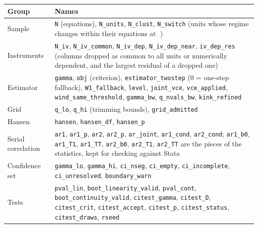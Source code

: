 \documentclass[
  10.5pt,
  a4paper,
]{article}
\newcounter{none} %
\begin{document}
{\def\LTcaptype{none} %
\begin{longtable}[]{@{}
  >{\raggedright\arraybackslash}p{}
  >{\raggedright\arraybackslash}p{}@{}}
\toprule\noalign{}
\begin{minipage}[b]{\linewidth}\raggedright
Group
\end{minipage} & \begin{minipage}[b]{\linewidth}\raggedright
Names
\end{minipage} \\
\midrule\noalign{}
\endhead
\bottomrule\noalign{}
\endlastfoot
Sample & \texttt{N} (equations), \texttt{N\_units}, \texttt{N\_clust},
\texttt{N\_switch} (units whose regime changes within their equations at
) \\
Instruments & \texttt{N\_iv}, \texttt{N\_iv\_common},
\texttt{N\_iv\_dep}, \texttt{N\_iv\_dep\_near}, \texttt{iv\_dep\_res}
(columns dropped as common to all units or numerically dependent, and
the largest residual of a dropped one) \\
Estimator & \texttt{gamma}, \texttt{obj} (criterion),
\texttt{estimator\_twostep} (0 = one-step fallback),
\texttt{W1\_fallback}, \texttt{level}, \texttt{joint\_vce},
\texttt{vce\_applied}, \texttt{wind\_same\_threshold},
\texttt{gamma\_bw}, \texttt{q\_nvals\_bw}, \texttt{kink\_refined} \\
Grid & \texttt{q\_lo}, \texttt{q\_hi} (trimming bounds),
\texttt{grid\_admitted} \\
Hansen & \texttt{hansen}, \texttt{hansen\_df}, \texttt{hansen\_p} \\
Serial correlation & \texttt{ar1}, \texttt{ar1\_p}, \texttt{ar2},
\texttt{ar2\_p}, \texttt{ar\_joint}, \texttt{ar1\_cond},
\texttt{ar2\_cond}; \texttt{ar1\_b0}, \texttt{ar1\_T1},
\texttt{ar1\_TT}, \texttt{ar2\_b0}, \texttt{ar2\_T1}, \texttt{ar2\_TT}
are the pieces of the statistics, kept for checking against Stata \\
Confidence set & \texttt{gamma\_lo}, \texttt{gamma\_hi},
\texttt{ci\_nseg}, \texttt{ci\_empty}, \texttt{ci\_incomplete},
\texttt{ci\_unresolved}, \texttt{boundary\_warn} \\
Tests & \texttt{pval\_lin}, \texttt{boot\_linearity\_valid},
\texttt{pval\_cont}, \texttt{boot\_continuity\_valid},
\texttt{citest\_gamma}, \texttt{citest\_D}, \texttt{citest\_crit},
\texttt{citest\_accept}, \texttt{citest\_p}, \texttt{citest\_status},
\texttt{citest\_draws}, \texttt{rseed} \\
\end{longtable}
}
\end{document}
